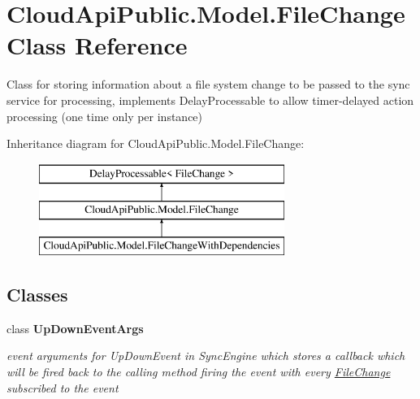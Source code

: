 \hypertarget{class_cloud_api_public_1_1_model_1_1_file_change}{\section{Cloud\-Api\-Public.\-Model.\-File\-Change Class Reference}
\label{class_cloud_api_public_1_1_model_1_1_file_change}
}


Class for storing information about a file system change to be passed to the sync service for processing, implements Delay\-Processable to allow timer-\/delayed action processing (one time only per instance)  


Inheritance diagram for Cloud\-Api\-Public.\-Model.\-File\-Change\-:\begin{figure}[H]
\begin{center}
\leavevmode
\includegraphics[height=3.000000cm]{class_cloud_api_public_1_1_model_1_1_file_change}
\end{center}
\end{figure}
\subsection*{Classes}
\begin{DoxyCompactItemize}
\item 
class {\bfseries Up\-Down\-Event\-Args}
\begin{DoxyCompactList}\small\item\em event arguments for Up\-Down\-Event in Sync\-Engine which stores a callback which will be fired back to the calling method firing the event with every \hyperlink{class_cloud_api_public_1_1_model_1_1_file_change}{File\-Change} subscribed to the event \end{DoxyCompactList}\end{DoxyCompactItemize}
